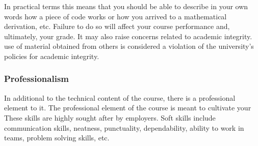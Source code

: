 \documentclass[letterpaper,10pt,english]{sphinxmanual}
\begin{document}
In practical terms this means that you should be able to describe in your own words how a piece of code works or how you arrived to a mathematical derivation, etc. Failure to do so will affect your course performance and, ultimately, your grade. It may also raise concerns related to academic integrity.  use of material obtained from others is considered a violation of the university’s policies for academic integrity.


\subsubsection{Professionalism}
\label{\detokenize{COMP170/organization:professionalism}}
In additional to the technical content of the course, there is a professional element to it. The professional element of the course is meant to cultivate your  These skills are highly sought after by employers. Soft skills include communication skills, neatness, punctuality, dependability, ability to work in teams, problem solving skills, etc.
\end{document}
